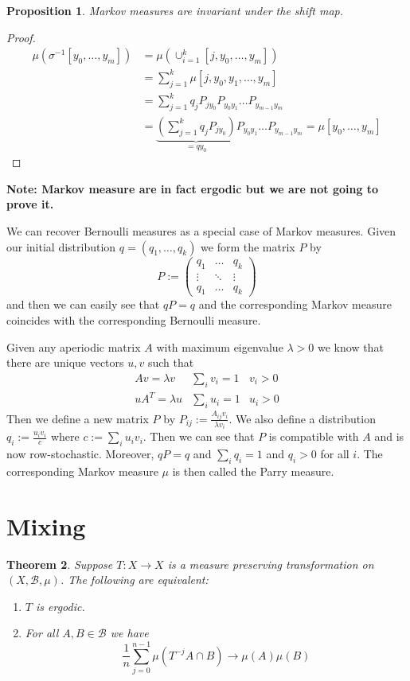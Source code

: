 \documentclass[11pt]{article}
\newcommand{\defeq}{:=}
\newcommand{\mdf}[1]{{\color{RoyalBlue} #1}}
\newenvironment{note}
	{\begin{mdframed}[backgroundcolor=white, linecolor=RubineRed, roundcorner=5pt, linewidth=1pt]\bfseries{Note:}\normalfont}
	{\end{mdframed}}
\newtheorem{prop}{Proposition}[section]
\newtheorem{theorem}[prop]{Theorem}
\begin{document}
\begin{prop}
Markov measures are invariant under the shift map.
\end{prop}

\begin{proof}
\begin{align*}
	\mu(\sigma^{-1}[y_0, \dots, y_m]) &= \mu\left( \cup_{i=1}^k [j, y_0, \dots, y_m]\right) \\
									  &= \sum_{j=1}^k\mu[j, y_0, y_1, \dots, y_m] \\
									  &= \sum_{j=1}^k q_jP_{j y_0} P_{y_0 y_1} \dots P_{y_{m-1} y_m} \\
									  &= \underbrace{\left( \sum_{j=1}^k q_j P_{j y_0}\right)}_{=qy_0}P_{y_0 y_1} \dots P_{y_{m-1} y_m}
									  = \mu[y_0, \dots, y_m]
\end{align*}
\end{proof}

\begin{note}
Markov measure are in fact ergodic but we are not going to prove it.
\end{note}

We can recover Bernoulli measures as a special case of Markov measures.
Given our initial distribution $q=(q_1, \dots, q_k)$ we form the matrix $P$ by
\[
P\defeq
\begin{pmatrix}
	q_1 & \dots & q_k \\
	\vdots & \ddots & \vdots \\
	q_1 & \dots & q_k
\end{pmatrix}
\]
and then we can easily see that $qP=q$ and the corresponding Markov measure coincides with the corresponding Bernoulli measure.

Given any aperiodic matrix $A$ with maximum eigenvalue $\lambda>0$ we know that there are unique vectors $u, v$ such that
\begin{align*}
	Av = \lambda v &\sum_{i}v_i=1 & v_i > 0 \\
	uA^T = \lambda u & \sum_{i}u_i =1 & u_i >0
\end{align*}
Then we define a new matrix $P$ by $P_{ij}\defeq\frac{A_{ij} v_i}{\lambda v_i}$.
We also define a distribution $q_i\defeq\frac{u_i v_i}{c}$ where $c\defeq \sum_{i}u_i v_i$.
Then we can see that $P$ is compatible with $A$ and is now row-stochastic.
Moreover, $qP=q$ and $\sum_{i}q_i = 1$ and $q_i>0$ for all $i$.
The corresponding Markov measure $\mu$ is then called the \mdf{Parry measure}.

\section{Mixing}
\begin{theorem}
Suppose $T:X \to X$ is a measure preserving transformation on $(X,\mathcal{B}, \mu)$.
The following are equivalent:
\begin{enumerate}[label=(\alph*)]
	\item $T$ is ergodic.
	\item For all $A,B\in\mathcal{B}$ we have
		\[
			\frac{1}{n}\sum_{j=0}^{n-1}\mu(T^{-j}A\cap B) \to \mu(A)\mu(B)
		\]
\end{enumerate}
\end{theorem}
\end{document}
